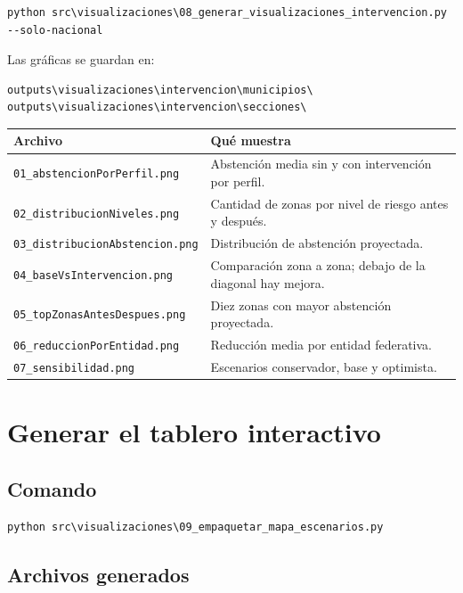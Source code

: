 \documentclass[11pt,a4paper]{article}
\begin{document}
\begin{lstlisting}[style=terminal]
python src\visualizaciones\08_generar_visualizaciones_intervencion.py --solo-nacional
\end{lstlisting}

Las gráficas se guardan en:

\begin{lstlisting}[style=terminal]
outputs\visualizaciones\intervencion\municipios\
outputs\visualizaciones\intervencion\secciones\
\end{lstlisting}

\begin{longtable}{p{}p{}}
\toprule
\textbf{Archivo} & \textbf{Qué muestra}\\
\midrule
\texttt{01\_abstencionPorPerfil.png} & Abstención media sin y con intervención por perfil.\\
\texttt{02\_distribucionNiveles.png} & Cantidad de zonas por nivel de riesgo antes y después.\\
\texttt{03\_distribucionAbstencion.png} & Distribución de abstención proyectada.\\
\texttt{04\_baseVsIntervencion.png} & Comparación zona a zona; debajo de la diagonal hay mejora.\\
\texttt{05\_topZonasAntesDespues.png} & Diez zonas con mayor abstención proyectada.\\
\texttt{06\_reduccionPorEntidad.png} & Reducción media por entidad federativa.\\
\texttt{07\_sensibilidad.png} & Escenarios conservador, base y optimista.\\
\bottomrule
\end{longtable}

\section{Generar el tablero interactivo}

\subsection{Comando}

\begin{lstlisting}[style=terminal]
python src\visualizaciones\09_empaquetar_mapa_escenarios.py
\end{lstlisting}

\subsection{Archivos generados}
\end{document}
